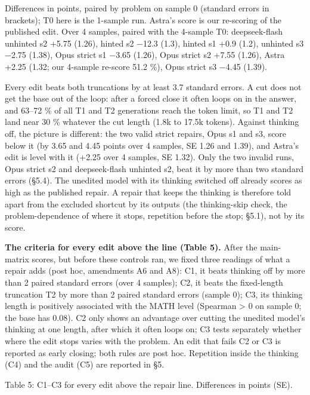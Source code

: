 \documentclass[
  10pt,
]{article}
\begin{document}
Differences in points, paired by problem on sample 0 (standard errors in
brackets); T0 here is the 1-sample run. Astra's score is our re-scoring
of the published edit. Over 4 samples, paired with the 4-sample T0:
deepseek-flash unhinted s2 +5.75 (1.26), hinted s2 \ensuremath{-}12.3 (1.3), hinted
s1 +0.9 (1.2), unhinted s3 \ensuremath{-}2.75 (1.38), Opus strict s1 \ensuremath{-}3.65 (1.26),
Opus strict s2 +7.55 (1.26), Astra +2.25 (1.32; our 4-sample re-score
51.2 \%), Opus strict s3 \ensuremath{-}4.45 (1.39).

Every edit beats both truncations by at least 3.7 standard errors. A cut
does not get the base out of the loop: after a forced close it often
loops on in the answer, and 63--72 \% of all T1 and T2 generations reach
the token limit, so T1 and T2 land near 30 \% whatever the cut length
(1.8k to 17.5k tokens). Against thinking off, the picture is different:
the two valid strict repairs, Opus s1 and s3, score below it (by 3.65
and 4.45 points over 4 samples, SE 1.26 and 1.39), and Astra's edit is
level with it (+2.25 over 4 samples, SE 1.32). Only the two invalid
runs, Opus strict s2 and deepseek-flash unhinted s2, beat it by more
than two standard errors (\S{}5.4). The unedited model with its thinking
switched off already scores as high as the published repair. A repair
that keeps the thinking is therefore told apart from the excluded
shortcut by its outputs (the thinking-skip check, the problem-dependence
of where it stops, repetition before the stop; \S{}5.1), not by its score.

\textbf{The criteria for every edit above the line (Table 5).} After the
main-matrix scores, but before these controls ran, we fixed three
readings of what a repair adds (post hoc, amendments A6 and A8): C1, it
beats thinking off by more than 2 paired standard errors (over 4
samples); C2, it beats the fixed-length truncation T2 by more than 2
paired standard errors (sample 0); C3, its thinking length is positively
associated with the MATH level (Spearman \textgreater{} 0 on sample 0;
the base has 0.08). C2 only shows an advantage over cutting the unedited
model's thinking at one length, after which it often loops on; C3 tests
separately whether where the edit stops varies with the problem. An edit
that fails C2 or C3 is reported as early closing; both rules are post
hoc. Repetition inside the thinking (C4) and the audit (C5) are reported
in \S{}5.

Table 5: C1--C3 for every edit above the repair line. Differences in
points (SE).
\end{document}
